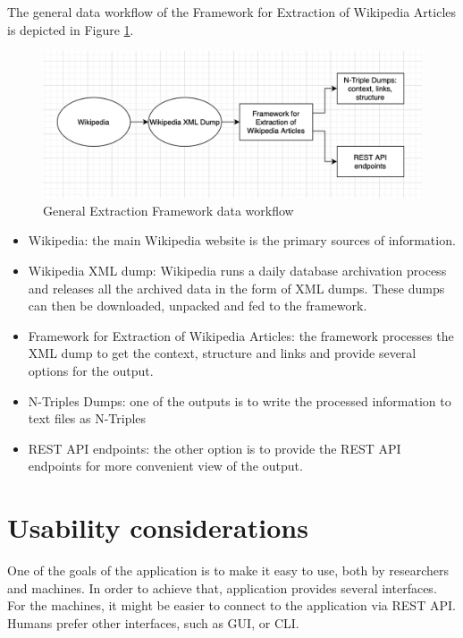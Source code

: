 \documentclass[thesis=M,english,hidelinks]{FITthesis}[2019/12/23]
\begin{document}
The general data workflow of the Framework for Extraction of Wikipedia Articles is depicted in Figure \ref{fig:general-architecture}.

\begin{figure}
	\centering
	\includegraphics[width=1.0\linewidth]{general_architecture}
	\caption{General Extraction Framework data workflow}
	\label{fig:general-architecture}
\end{figure}

\begin{itemize}
	\item Wikipedia: the main Wikipedia website is the primary sources of information.
	\item Wikipedia XML dump: Wikipedia runs a daily database archivation process and releases all the archived data in the form of XML dumps. These dumps can then be downloaded, unpacked and fed to the framework.
	\item Framework for Extraction of Wikipedia Articles:  the framework processes the XML dump to get the context, structure and links and provide several options for the output.
	\item N-Triples Dumps: one of the outputs is to write the processed information to text files as N-Triples
	\item REST API endpoints: the other option is to provide the REST API endpoints for more convenient view of the output.
\end{itemize}


\section{Usability considerations}\label{usability_considerations}

One of the goals of the application is to make it easy to use, both by researchers and machines. In order to achieve that, application provides several interfaces. For the machines, it might be easier to connect to the application via \gls{REST} \gls{API}. Humans prefer other interfaces, such as \gls{GUI}, or \gls{CLI}.
\end{document}
